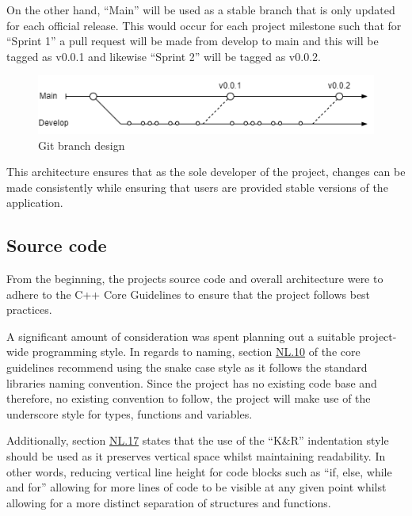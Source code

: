 \documentclass[11pt]{article}
\begin{document}
On the other hand, ``Main'' will be used as a stable branch that is only updated
for each official release. This would occur for each project milestone such that
for ``Sprint 1'' a pull request will be made from develop to main and this will
be tagged as v0.0.1 and likewise ``Sprint 2'' will be tagged as v0.0.2.

\begin{figure}[H]
  \centering
  \includegraphics[width=\textwidth]{images/current_branch_design.png}
  \caption{Git branch design}
  \label{fig:brancharch}
\end{figure}

This architecture ensures that as the sole developer of the project, changes can
be made consistently while ensuring that users are provided stable versions of
the application.

\subsection{Source code}
From the beginning, the projects source code and overall architecture were to
adhere to the C++ Core Guidelines \cite{cpp-guidelines} to ensure that the
project follows best practices.

A significant amount of consideration was spent planning out a suitable
project-wide programming style. In regards to naming, section
\href{http://isocpp.github.io/CppCoreGuidelines/CppCoreGuidelines#nl10-prefer-underscore_style-names}{NL.10}
of the core guidelines recommend using the snake case style as it follows the
standard libraries naming convention. Since the project has no existing code
base and therefore, no existing convention to follow, the project will make use
of the underscore style for types, functions and variables. 

Additionally, section
\href{https://isocpp.github.io/CppCoreGuidelines/CppCoreGuidelines#nl17-use-kr-derived-layout}{NL.17}
states that the use of the ``K\&R''  indentation style \cite{indentation} should
be used as it preserves vertical space whilst maintaining readability. In other
words, reducing vertical line height for code blocks such as ``if, else, while
and for'' allowing for more lines of code to be visible at any given point
whilst allowing for a more distinct separation of structures and functions.
\end{document}
